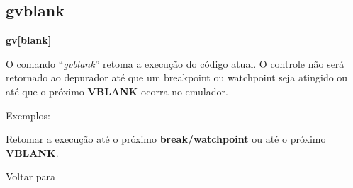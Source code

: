 \documentclass[letterpaper,10pt,brazil]{sphinxmanual}
\begin{document}
\subsection{gvblank}
\label{debugger/execution:gvblank}\label{debugger/execution:debugger-command-gvblank}
\begin{DUlineblock}{0em}
\item[]
\begin{DUlineblock}{\DUlineblockindent}
\item[] \textbf{gv{[}blank{]}}
\item[] 
\end{DUlineblock}
\item[] O comando ``\emph{gvblank}'' retoma a execução do código atual. O controle não será retornado ao depurador até que um breakpoint ou watchpoint seja atingido ou até que o próximo \textbf{VBLANK} ocorra no emulador.
\item[] 
\item[] Exemplos:
\item[] 
\item[]
\begin{DUlineblock}{\DUlineblockindent}
\item[] 
\item[] 
\end{DUlineblock}
\item[] Retomar a execução até o próximo \textbf{break/watchpoint} ou até o próximo \textbf{VBLANK}.
\item[] 
\item[] Voltar para {\hyperref[debugger/execution:debugger\string-execution\string-list]{}}
\end{DUlineblock}
\begin{quote}
\label{debugger/execution:debugger-command-gint}\end{quote}
\end{document}
